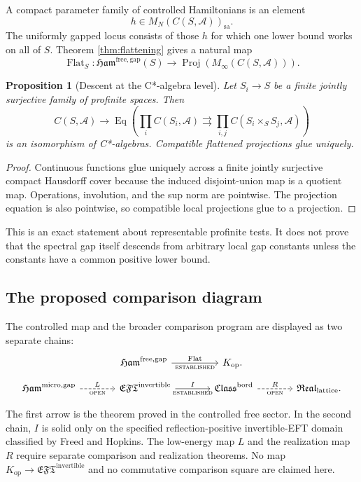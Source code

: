 \documentclass[12pt]{article}
\newtheorem{proposition}[theorem]{Proposition}
\theoremstyle{definition}
\theoremstyle{remark}
\newcommand{\A}{\mathcal A}
\newcommand{\Ham}{\mathfrak{Ham}}
\newcommand{\EFT}{\mathfrak{EFT}}
\newcommand{\Class}{\mathfrak{Class}}
\newcommand{\Real}{\mathfrak{Real}}
\newcommand{\status}[1]{\textsc{#1}}
\begin{document}
A compact parameter family of controlled Hamiltonians is an element
\[
h\in M_N(C(S,\A))_{\mathrm{sa}}.
\]
The uniformly gapped locus consists of those $h$ for which one lower bound
works on all of $S$.
Theorem \ref{thm:flattening} gives a natural map
\[
\operatorname{Flat}_S:
\Ham^{\mathrm{free,gap}}(S)
\longrightarrow
\operatorname{Proj}(M_\infty(C(S,\A))).
\]

\begin{proposition}[Descent at the C*-algebra level]
Let $S_i\to S$ be a finite jointly surjective family of profinite spaces.
Then
\[
C(S,\A)
\longrightarrow
\operatorname{Eq}
\left(
\prod_iC(S_i,\A)
\rightrightarrows
\prod_{i,j}C(S_i\times_SS_j,\A)
\right)
\]
is an isomorphism of C*-algebras.
Compatible flattened projections glue uniquely.
\end{proposition}

\begin{proof}
Continuous functions glue uniquely across a finite jointly surjective compact
Hausdorff cover because the induced disjoint-union map is a quotient map.
Operations, involution, and the sup norm are pointwise.
The projection equation is also pointwise, so compatible local projections
glue to a projection.
\end{proof}

This is an exact statement about representable profinite tests.
It does not prove that the spectral gap itself descends from arbitrary local
gap constants unless the constants have a common positive lower bound.

\subsection{The proposed comparison diagram}

The controlled map and the broader comparison program are displayed as two
separate chains:
\[
\begin{tikzcd}[column sep=huge]
\Ham^{\mathrm{free,gap}}
  \arrow[r,"\operatorname{Flat}","\status{established}"']
&
K_{\mathrm{op}}.
\end{tikzcd}
\]
\[
\begin{tikzcd}[column sep=large]
\Ham^{\mathrm{micro,gap}}
  \arrow[r,dashed,"L","\status{open}"']
&
\EFT^{\mathrm{invertible}}
  \arrow[r,"I","\status{established}"']
&
\Class^{\mathrm{bord}}
  \arrow[r,dashed,"R","\status{open}"']
&
\Real_{\mathrm{lattice}}.
\end{tikzcd}
\]

The first arrow is the theorem proved in the controlled free sector.  In the
second chain, $I$ is solid only on the specified reflection-positive
invertible-EFT domain classified by Freed and Hopkins.  The low-energy map
$L$ and the realization map $R$ require separate comparison and realization
theorems.  No map $K_{\mathrm{op}}\to\EFT^{\mathrm{invertible}}$ and no
commutative comparison square are claimed here.
\end{document}
